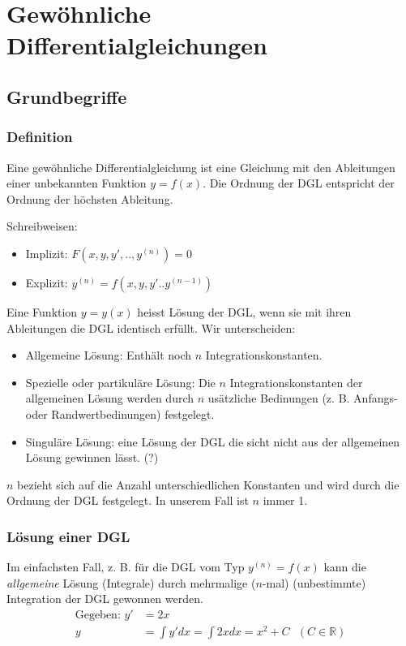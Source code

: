 \chapter{Gewöhnliche Differentialgleichungen}
\section{Grundbegriffe}
\subsection{Definition}
\begin{definition}
Eine gewöhnliche Differentialgleichung ist eine Gleichung mit den Ableitungen einer unbekannten Funktion $y=f(x)$. Die Ordnung der DGL entspricht der Ordnung der höchsten Ableitung.

Schreibweisen:
\begin{itemize}
	\item Implizit: $F(x, y, y', .. ,y^{(n)}) = 0$
	\item Explizit: $y^{(n)} = f(x, y, y' .. y^{(n-1)})$
\end{itemize}

Eine Funktion $y=y(x)$ heisst Lösung der DGL, wenn sie mit ihren Ableitungen die DGL identisch erfüllt. Wir unterscheiden:
\begin{itemize}
	\item Allgemeine Lösung: Enthält noch $n$ Integrationskonstanten.
	\item Spezielle oder partikuläre Lösung: Die $n$ Integrationskonstanten der allgemeinen Lösung werden durch $n$ usätzliche Bedinungen (z. B. Anfangs- oder Randwertbedinungen) festgelegt.
	\item Singuläre Lösung: eine Lösung der DGL die sicht nicht aus der allgemeinen Lösung gewinnen lässt. (?)
\end{itemize}
$n$ bezieht sich auf die Anzahl unterschiedlichen Konstanten und wird durch die Ordnung der DGL festgelegt. In unserem Fall ist $n$ immer 1.
\end{definition}

\subsection{Lösung einer DGL}
Im einfachsten Fall, z. B. für die DGL vom Typ $y^{(n)} = f(x)$ kann die \textit{allgemeine} Lösung (Integrale) durch mehrmalige ($n$-mal) (unbestimmte) Integration der DGL gewonnen werden.
\begin{align*}
	 \text{Gegeben: } y' &= 2x\\
	  y &= \int y' dx = \int 2x dx = x^2 + C  \text{        }(C \in \mathbb{R})	
\end{align*}

